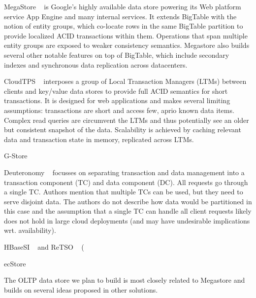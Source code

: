 \documentclass[10pt,final,journal]{IEEEtran}
\begin{document}
MegaStore ~\cite{Furman:2008:8530095, Baker:2011:8530095} is Google's highly available data store powering its Web platform service App Engine and many internal services. It extends BigTable with the notion of entity groups, which co-locate rows in the same BigTable partition to provide localized ACID transactions within them. Operations that span multiple entity groups are exposed to weaker consistency semantics. Megastore also builds several other notable features on top of BigTable, which include secondary indexes and synchronous data replication across datacenters.

CloudTPS ~\cite{Zhou:2011:5740834} interposes a group of Local Transaction Managers (LTMs) between clients and key/value data stores to provide full ACID semantics for short transactions. It is designed for web applications and makes several limiting assumptions: transactions are short and access few, aprio known data items. Complex read queries are circumvent the LTMs and thus potentially see an older but consistent snapshot of the data. Scalability is achieved by caching relevant data and transaction state in memory, replicated across LTMs.

G-Store

Deuteronomy ~\cite{Levandoski:2011:8530161} focusses on separating transaction and data management into a transaction component (TC) and data component (DC). All requests go through a single TC. Authors mention that multiple TCs can be used, but they need to serve disjoint data. The authors do not describe how data would be partitioned in this case and the assumption that a single TC can handle all client requests likely does not hold in large cloud deployments (and may have undesirable implications wrt. availability).

HBaseSI ~\cite{} and ReTSO ~\cite{} (

ecStore ~\cite{}

The OLTP data store we plan to build is most closely related to Megastore and builds on several ideas proposed in other solutions.
\end{document}
